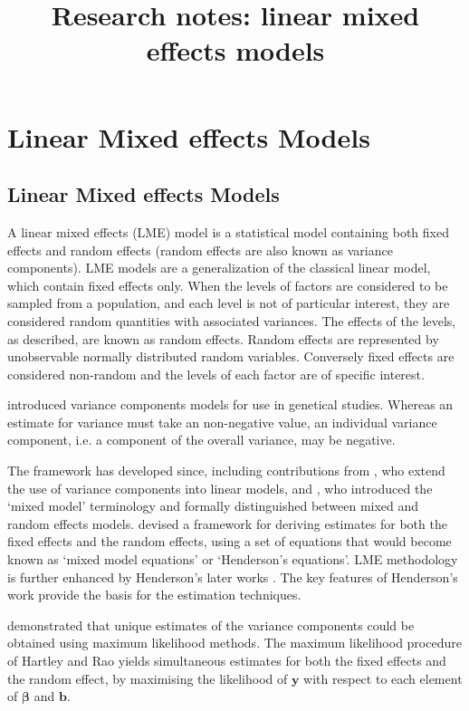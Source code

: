 \documentclass[12pt, a4paper]{report}
\title{Research notes: linear mixed effects models}
\author{ } \date{ }
\theoremstyle{plain}
\theoremstyle{definition}
\theoremstyle{remark}
\begin{document}
	\tableofcontents
	
	\chapter{Linear Mixed effects Models}
	
	
	\section{Linear Mixed effects Models}
	A linear mixed effects (LME) model is a statistical model containing both fixed effects and random effects (random effects are also known as variance components). LME models are a generalization of the classical linear model, which contain fixed effects only. When the levels of factors are considered to be sampled from a population, and each level is not of particular interest, they are considered random quantities with associated variances. The effects of the levels, as described, are known as random effects. Random effects are represented by unobservable normally distributed random variables. Conversely fixed effects are considered non-random and the levels of each factor are of specific interest.
	
	\citet{Fisher4} introduced variance components models for use in genetical studies. Whereas an estimate for variance must take an non-negative value, an individual variance component, i.e. a component of the overall variance, may be negative.
	
	
	The framework has developed since, including contributions from
	\citet{tippett}, who extend the use of variance components into linear models, and \citet{eisenhart}, who introduced the `mixed model' terminology and formally distinguished between mixed and random effects models. \citet{Henderson:1950} devised a framework for deriving estimates for both the fixed effects and the random effects, using a set of equations that would become known as `mixed model equations' or `Henderson's equations'.
	LME methodology is further enhanced by Henderson's later works \citep{Henderson53, Henderson59,Henderson63,Henderson73,Henderson84a}. The key features of Henderson's work provide the basis for the estimation techniques.
	
	\citet{HartleyRao} demonstrated that unique estimates of the variance components could be obtained using maximum likelihood methods. The maximum likelihood procedure of Hartley and Rao yields simultaneous estimates for both the fixed effects and the random effect, by maximising the likelihood of $\boldsymbol{y}$ with respect to each element of $\boldsymbol{\beta}$ and $\boldsymbol{b}$.
		
\end{document}
